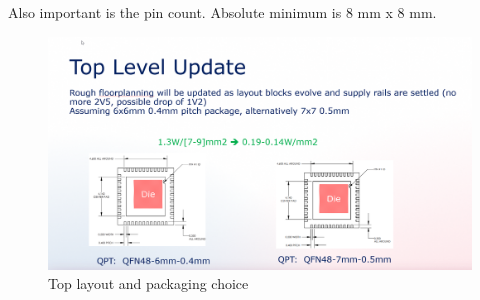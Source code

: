 Also important is the pin count. Absolute minimum is 8 \unit{\milli\metre} x 8 mm.

\begin{figure}[ht!]
	\centering %
	\includegraphics[width=0.5\linewidth]{Figures/powerpoint-toplevel-packaging.png}
	\caption{Top layout and packaging choice}
	\label{fig:powerpoint-toplevel-packaging}
\end{figure}